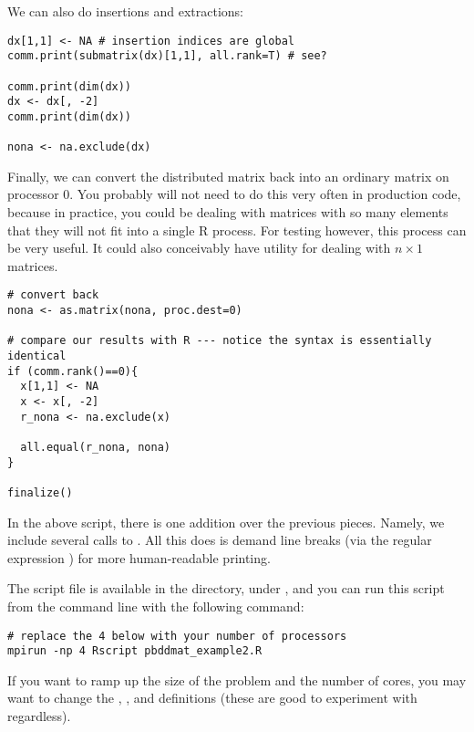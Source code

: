 We can also do insertions and extractions:

\begin{lstlisting}[language=rr,title=Insertion and Extraction]
dx[1,1] <- NA # insertion indices are global
comm.print(submatrix(dx)[1,1], all.rank=T) # see?

comm.print(dim(dx))
dx <- dx[, -2]
comm.print(dim(dx))

nona <- na.exclude(dx)
\end{lstlisting}

Finally, we can convert the distributed matrix back into an ordinary  matrix on processor 0.  You probably will not need to do this very often in production code, because in practice, you could be dealing with matrices with so many elements that they will not fit into a single R process.  For testing however, this process can be very useful.  It could also conceivably have utility for dealing with $n\times 1$ matrices.

\begin{lstlisting}[language=rr,title=Insertion and Extraction]
# convert back
nona <- as.matrix(nona, proc.dest=0)

# compare our results with R --- notice the syntax is essentially identical
if (comm.rank()==0){
  x[1,1] <- NA
  x <- x[, -2]
  r_nona <- na.exclude(x)
  
  all.equal(r_nona, nona)
}

finalize()
\end{lstlisting}


In the above script, there is one addition over the previous pieces.  Namely, we include several calls to .  All this does is demand line breaks (via the regular expression ) for more human-readable printing.

The script file is available in the  directory, under , and you can run this script from the command line with the following command:

\begin{lstlisting}
# replace the 4 below with your number of processors
mpirun -np 4 Rscript pbddmat_example2.R
\end{lstlisting}

If you want to ramp up the size of the problem and the number of cores, you may want to change the , , and  definitions (these are good to experiment with regardless). 